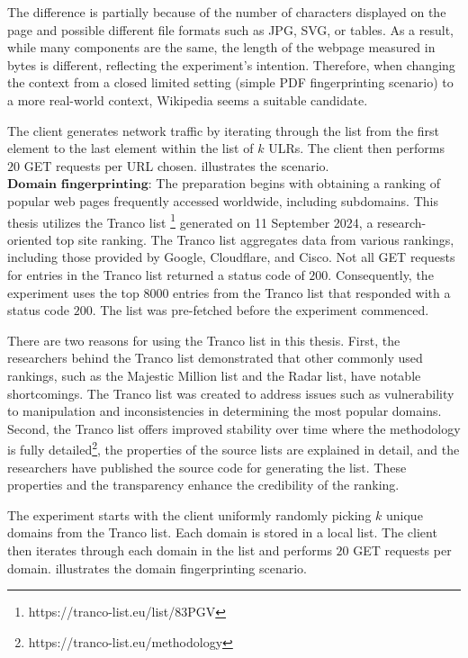 The difference is partially because of the number of characters displayed on the page and possible different file formats such as JPG, SVG, or tables. As a result, while many components are the same, the length of the webpage measured in bytes is different, reflecting the experiment's intention. Therefore, when changing the context from a closed limited setting (simple PDF fingerprinting scenario) to a more real-world context, Wikipedia seems a suitable candidate.

The client generates network traffic by iterating through the list from the first element to the last element within the list of $k$ ULRs. The client then performs $20$ GET requests per URL chosen.  illustrates the scenario. \\

$\textbf{Domain fingerprinting}$: The preparation begins with obtaining a ranking of popular web pages frequently accessed worldwide, including subdomains. This thesis utilizes the Tranco list \footnote{https://tranco-list.eu/list/83PGV} generated on 11 September 2024, a research-oriented top site ranking. The Tranco list aggregates data from various rankings, including those provided by Google, Cloudflare, and Cisco. Not all GET requests for entries in the Tranco list returned a status code of $200$. Consequently, the experiment uses the top $8000$ entries from the Tranco list that responded with a status code $200$. The list was pre-fetched before the experiment commenced.

There are two reasons for using the Tranco list in this thesis. First, the researchers behind the Tranco list \cite{LePochat2019} demonstrated that other commonly used rankings, such as the Majestic Million list and the Radar list, have notable shortcomings. The Tranco list was created to address issues such as vulnerability to manipulation and inconsistencies in determining the most popular domains. Second, the Tranco list offers improved stability over time where the methodology is fully detailed\footnote{https://tranco-list.eu/methodology}, the properties of the source lists are explained in detail, and the researchers have published the source code for generating the list. These properties and the transparency enhance the credibility of the ranking.

The experiment starts with the client uniformly randomly picking $k$ unique domains from the Tranco list. Each domain is stored in a local list. The client then iterates through each domain in the list and performs $20$ GET requests per domain.  illustrates the domain fingerprinting scenario.\\

